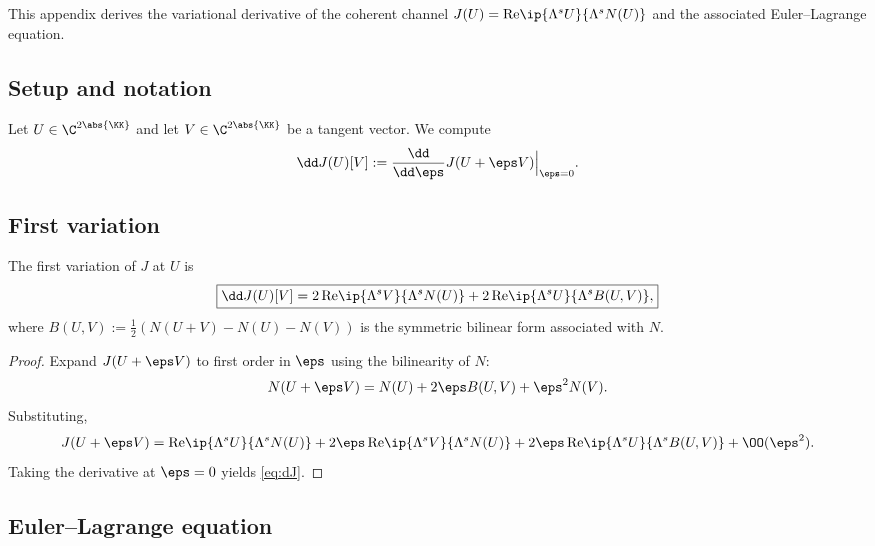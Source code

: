This appendix derives the variational derivative of the coherent 
channel $J(U) = \mathrm{Re}\ip{\Lambda^s U}{\Lambda^s N(U)}$ and 
the associated Euler--Lagrange equation.

\subsection{Setup and notation}
\label{ssec:B-setup}

Let $U\in\C^{2\abs{\KK}}$ and let $V\in\C^{2\abs{\KK}}$ be a 
tangent vector. We compute
\begin{equation}\label{eq:dJ-def}
\dd J(U)[V] := \frac{\dd}{\dd\eps}J(U+\eps V)\Big|_{\eps=0}.
\end{equation}

\subsection{First variation}
\label{ssec:B-first-variation}

\begin{proposition}\label{prop:dJ}
The first variation of $J$ at $U$ is
\begin{equation}\label{eq:dJ}
\boxed{
\dd J(U)[V] = 2\,\mathrm{Re}\ip{\Lambda^s V}{\Lambda^s N(U)} + 
2\,\mathrm{Re}\ip{\Lambda^s U}{\Lambda^s B(U,V)},
}
\end{equation}
where $B(U,V) := \tfrac12(N(U+V)-N(U)-N(V))$ is the symmetric 
bilinear form associated with $N$.
\end{proposition}

\begin{proof}
Expand $J(U+\eps V)$ to first order in $\eps$ using the bilinearity 
of $N$:
\begin{equation*}
N(U+\eps V) = N(U) + 2\eps B(U,V) + \eps^2 N(V).
\end{equation*}
Substituting,
\begin{equation*}
J(U+\eps V) = \mathrm{Re}\ip{\Lambda^s U}{\Lambda^s N(U)} + 
2\eps\,\mathrm{Re}\ip{\Lambda^s V}{\Lambda^s N(U)} + 
2\eps\,\mathrm{Re}\ip{\Lambda^s U}{\Lambda^s B(U,V)} + 
\OO(\eps^2).
\end{equation*}
Taking the derivative at $\eps=0$ yields \eqref{eq:dJ}.
\end{proof}

\subsection{Euler--Lagrange equation}
\label{ssec:B-EL}

